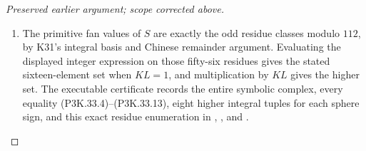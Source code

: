 \begin{proof}[Preserved earlier argument; scope corrected above]
\begin{enumerate}[label=\arabic*.]
\item The primitive fan values of \(S\) are exactly the odd residue
classes modulo \(112\), by K31's integral basis and Chinese
remainder argument. Evaluating the displayed integer expression
on those fifty-six residues gives the stated sixteen-element set
when \(KL=1\), and multiplication by \(KL\) gives the higher
set. The executable certificate records the entire symbolic
complex, every equality (P3K.33.4)--(P3K.33.13), eight higher integral
tuples for each sphere sign, and this exact residue enumeration in
,
, and
.

\end{enumerate}
\end{proof}
